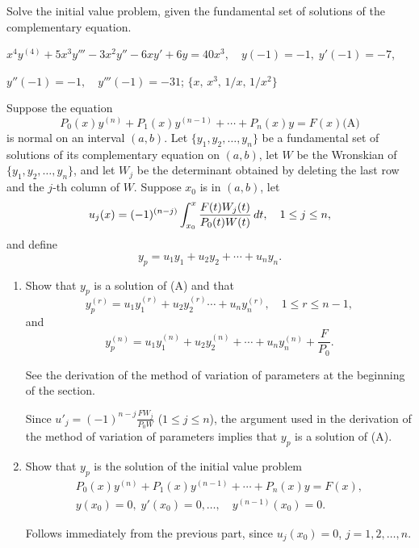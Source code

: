 \documentclass{ximera}
\begin{document}
\begin{problem}\label{exer:9.4.33}
Solve the
initial value problem, given the fundamental set of solutions of the complementary equation.

$x^4y^{{(4)}}+5x^3y'''-3x^2y''-6xy'+6y=40x^3,
\quad  y(-1)=-1, \;  y'(-1)=-7$,

$y''(-1)=-1,\quad y'''(-1)=-31$;\quad
$\{x,\, x^3,\,1/x,\,1/x^2\}$
\end{problem}

\begin{problem}\label{exer:9.4.34}
Suppose the equation
$$
P_0(x)y^{(n)}+P_1(x)y^{(n-1)}+\cdots+P_n(x)y=F(x)
\text{(A)}
$$
is normal on an interval $(a,b)$. Let $\{y_1,y_2,\dots,y_n\}$ be a
fundamental set of solutions of its complementary equation on $(a,b)$,
let $W$ be the Wronskian of $\{y_1,y_2,\dots,y_n\}$, and let $W_j$ be
the determinant obtained by deleting the last row and the $j$-th
column of $W$. Suppose $x_0$ is in $(a,b)$, let
$$
u_j(x)=(-1)^{(n-j)}\int_{x_0}^x{F(t)W_j(t)\over P_0(t)W(t)}\,dt,
\quad 1\le j\le n,
$$
and define
$$
y_p=u_1y_1+u_2y_2+\cdots+u_ny_n.
$$
\begin{enumerate}
\item %
Show that $y_p$ is a solution of (A) and that
$$
y_p^{(r)}=u_1y^{(r)}_1+u_2y_2^{(r)}\cdots+u_ny^{(r)}_n,\quad 1
\le r \le n-1,
$$
and
$$
y_p^{(n)}=u_1y_1^{(n)}+u_2y_2^{(n)}+\cdots+u_ny_n^{(n)}+\frac{F}{P_0}.
$$
\begin{hint}
See the derivation of the method of variation of
parameters at the beginning of the section.
\end{hint}

\begin{solution}
Since
$u'_j=(-1)^{n-j}\frac{FW_j}{P_0W}$  ($1\le j\le n$), the argument
used in the derivation of the method of variation of parameters
implies that $y_p$ is a solution of (A).
\end{solution}

\item %
Show that  $y_p$  is the
solution of the initial value problem
$$
\begin{array}{r}
P_0(x)y^{(n)}+P_1(x)y^{(n-1)}+\cdots+P_n(x)y=F(x),\\y(x_0)=0,\;
y'(x_0)=0,\dots,\quad y^{(n-1)}(x_0)=0.
\end{array}
$$

\begin{solution}
Follows immediately from the previous part, since $u_j(x_0)=0$,
$j=1,2,\dots,n$.
\end{solution}


\end{enumerate}
\end{problem}
\end{document}
